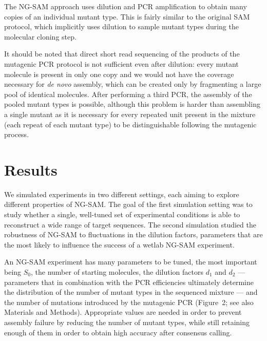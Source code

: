 \documentclass[10pt]{article}
\newcommand{\blue}[1]{{\color{blue} #1}}
\begin{document}
The NG-SAM approach uses dilution and PCR amplification to obtain many copies of an individual mutant type. This is fairly similar to the original SAM protocol, which implicitly uses dilution to sample mutant types during the molecular cloning step.

It should be noted that direct short read sequencing of the products of the mutagenic PCR protocol is not sufficient even after dilution: every mutant molecule is present in only one copy and we would not have the coverage necessary for {\it de novo} assembly, which can be created only by fragmenting a large pool of identical molecules.
After performing a third PCR, the assembly of the pooled mutant types is possible, although this problem is harder than assembling a single mutant as it is necessary for every repeated unit present in the mixture (each repeat of each mutant type) to be distinguishable following the mutagenic process.

\section*{Results}

We simulated experiments in two different settings, each aiming to explore different properties of  NG-SAM.
The goal of the first simulation setting was to study whether a single, well-tuned set of experimental conditions is able to reconstruct a wide range of target sequences. The second simulation studied the robustness of NG-SAM to fluctuations in the dilution factors, parameters that are the most likely to influence the success of a wetlab NG-SAM experiment.

An NG-SAM experiment has many parameters to be tuned, the most important being $S_0$, the number of starting molecules, the dilution factors $d_1$ and $d_2$ --- parameters that in combination with the PCR efficiencies ultimately determine the distribution of the number of mutant types in the sequenced mixture --- and the number of mutations introduced by the mutagenic PCR (Figure~2; see also Materials and Methods). \blue{Appropriate values are needed} in order to prevent assembly failure by reducing the number of mutant types, while still retaining enough of them in order to obtain high accuracy after consensus calling.
\end{document}
